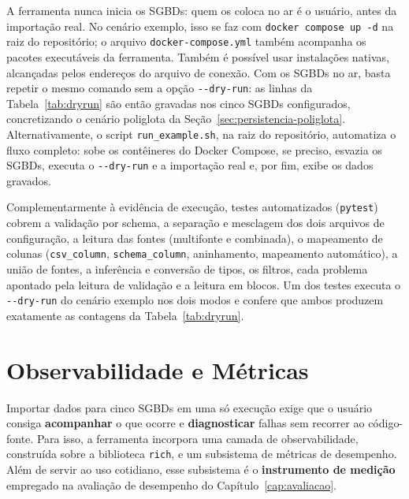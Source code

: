 A ferramenta nunca inicia os SGBDs: quem os coloca no ar é o usuário, antes da
importação real. No cenário exemplo, isso se faz com \texttt{docker compose up -d} na raiz
do repositório; o arquivo \texttt{docker-compose.yml} também acompanha os pacotes
executáveis da ferramenta. Também é possível usar instalações nativas, alcançadas pelos
endereços do arquivo de conexão. Com os SGBDs no ar, basta repetir o mesmo comando sem a
opção \texttt{-{}-dry-run}: as linhas da Tabela~\ref{tab:dryrun} são então gravadas nos
cinco SGBDs configurados, concretizando o cenário poliglota da
Seção~\ref{sec:persistencia-poliglota}. Alternativamente, o script
\texttt{run\_example.sh}, na raiz do repositório, automatiza o fluxo completo: sobe os
contêineres do Docker Compose, se preciso, esvazia os SGBDs, executa o \texttt{-{}-dry-run}
e a importação real e, por fim, exibe os dados gravados.

Complementarmente à evidência de execução, testes automatizados (\texttt{pytest}) cobrem
a validação por schema, a separação e mesclagem dos dois arquivos de configuração, a
leitura das fontes (multifonte e combinada), o mapeamento de colunas
(\texttt{csv\_column}, \texttt{schema\_column}, aninhamento, mapeamento automático), a
união de fontes, a inferência e conversão de tipos, os filtros, cada problema apontado pela
leitura de validação e a leitura em blocos. Um dos testes executa o \texttt{-{}-dry-run}
do cenário exemplo nos dois modos e confere que ambos produzem exatamente as contagens da
Tabela~\ref{tab:dryrun}.

\section{Observabilidade e Métricas}
\label{sec:observabilidade}

Importar dados para cinco SGBDs em uma só execução exige que o usuário consiga
\textbf{acompanhar} o que ocorre e \textbf{diagnosticar} falhas sem recorrer ao
código-fonte. Para isso, a ferramenta incorpora uma camada de observabilidade,
construída sobre a biblioteca \texttt{rich}, e um subsistema de métricas de desempenho.
Além de servir ao uso cotidiano, esse subsistema é o \textbf{instrumento de medição}
empregado na avaliação de desempenho do Capítulo~\ref{cap:avaliacao}.

